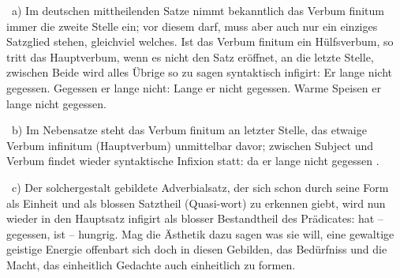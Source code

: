 ~a) Im deutschen mittheilenden Satze nimmt bekanntlich das Verbum finitum immer die zweite Stelle ein; vor diesem darf, muss aber auch nur ein einziges Satzglied stehen, gleichviel welches. Ist das Verbum finitum ein Hülfsverbum, so tritt das Hauptverbum, wenn es nicht den Satz eröffnet, an die letzte Stelle, zwischen Beide wird alles Übrige so zu sagen syntaktisch infigirt: Er  lange nicht gegessen. Gegessen  er lange nicht: Lange  er nicht gegessen. Warme Speisen  er lange nicht gegessen.

\label{fp.429}

{\color{lsMidBlue}~b)} Im Nebensatze steht das Verbum finitum an letzter Stelle, das etwaige Verbum infinitum (Hauptverbum) unmittelbar davor; zwischen Subject und Verbum findet wieder syntaktische Infixion statt: da er lange nicht gegessen .

~c) Der solchergestalt gebildete Adverbialsatz, der sich schon durch seine Form als Einheit und als blossen Satztheil (Quasi-wort) zu erkennen giebt, wird nun wieder in den Hauptsatz infigirt als blosser Bestandtheil des Prädicates: hat – gegessen, ist – hungrig. Mag die Ästhetik dazu sagen was sie will, eine gewaltige geistige Energie offenbart sich doch in diesen Gebilden, das Bedürfniss und die Macht, das einheitlich Gedachte auch einheitlich zu formen.

